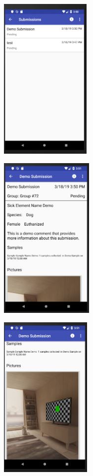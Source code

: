 \documentclass[onecolumn, draftclsnofoot,10pt, compsoc]{IEEEtran}
\begin{document}
\begin{center}
\includegraphics[height=8cm]{Beta_submissions.png}
\end{center}

\begin{center}
\includegraphics[height=8cm]{Beta_detailed_submission_1.png}
\end{center}

\begin{center}
\includegraphics[height=8cm]{Beta_detailed_submission_2.png}
\end{center}
\end{document}
